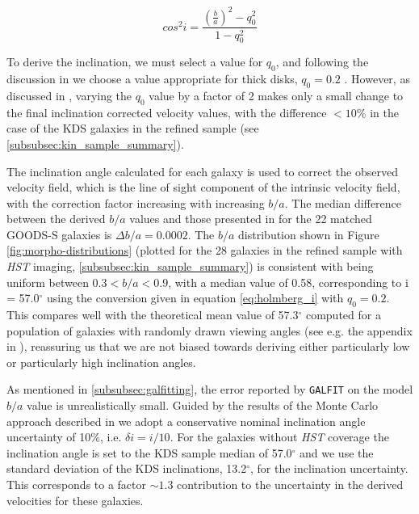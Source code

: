 \documentclass[fleqn,usenatbib]{mn2e}
\begin{document}
\begin{equation}\label{eq:holmberg_i}
   cos^{2}i = \frac{\left(\frac{b}{a}\right)^{2} - q_{0}^{2}}{1 - q_{0}^{2}}
\end{equation}


To derive the inclination, we must select a value for $q_{0}$, and following the discussion in \citep{Law2012a} we choose a value appropriate for thick disks, $q_{0} = 0.2$ \citep[e.g.][]{Epinat2012,Harrison2017}.
However, as discussed in \cite{Harrison2017}, varying the $q_{0}$ value by a factor of 2 makes only a small change to the final inclination corrected velocity values, with the difference $<10\%$ in the case of the KDS galaxies in the refined sample (see \cref{subsubsec:kin_sample_summary}).

The inclination angle calculated for each galaxy is used to correct the observed velocity field, which is the line of sight component of the intrinsic velocity field, with the correction factor increasing with increasing $b/a$.
The median difference between the derived $b/a$ values and those presented in \cite{VanderWel2012} for the 22 matched GOODS-S galaxies is $\Delta b/a = 0.0002$.
The $b/a$ distribution shown in Figure \ref{fig:morpho-distributions} (plotted for the 28 galaxies in the refined sample with {\em HST} imaging, \cref{subsubsec:kin_sample_summary}) is consistent with being uniform between $0.3 < b/a < 0.9$, with a median value of 0.58, corresponding to i = 57.0$^{\circ}$ using the conversion given in equation \ref{eq:holmberg_i} with $q_{0}=0.2$.
This compares well with the theoretical mean value of 57.3$^{\circ}$ computed for a population of galaxies with randomly drawn viewing angles (see e.g. the appendix in \citealt{Law2009}), reassuring us that we are not biased towards deriving either particularly low or particularly high inclination angles.

As mentioned in \cref{subsubsec:galfitting}, the error reported by {\tt GALFIT} on the model $b/a$ value is unrealistically small.
Guided by the results of the Monte Carlo approach described in \cite{Epinat2012} we adopt a conservative nominal inclination angle uncertainty of 10$\%$, i.e. $\delta i = i / 10$.
For the galaxies without {\em HST} coverage the inclination angle is set to the KDS sample median of 57.0$^{\circ}$ and we use the standard deviation of the KDS inclinations, 13.2$^{\circ}$, for the inclination uncertainty.
This corresponds to a factor $\sim1.3$ contribution to the uncertainty in the derived velocities for these galaxies.
\end{document}
